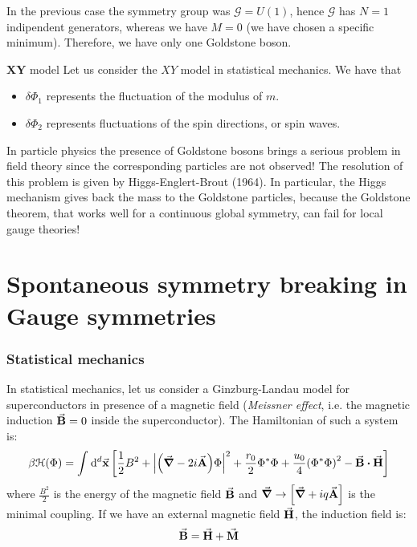 \documentclass[../main/main.tex]{subfiles}
\begin{document}
In the previous case the symmetry group was \( \mathcal{G} = U (1) \), hence \( \mathcal{G} \) has \( N=1 \) indipendent generators, whereas we have \( M=0 \) (we have chosen a specific minimum). Therefore, we have only one Goldstone boson.


\begin{example}{\(\pmb{XY}\) model}{}
Let us consider the \( XY \) model in statistical mechanics. We have that
\begin{itemize}
\item \( \delta \Phi _1 \) represents the fluctuation of the modulus of \( m \).
\item \( \delta \Phi _2 \) represents fluctuations of the spin directions, or spin waves.
\end{itemize}
\end{example}

\begin{remark}
In particle physics the presence of Goldstone bosons brings a serious problem in field theory since the corresponding particles are not observed! The resolution of this problem is given by Higgs-Englert-Brout (1964). In particular, the Higgs mechanism gives back the mass to the Goldstone particles, because the Goldstone theorem, that works well for a continuous global symmetry, can fail for local gauge theories!
\end{remark}



\section{Spontaneous symmetry breaking in Gauge symmetries}

\subsubsection{Statistical mechanics}

In statistical mechanics, let us consider a Ginzburg-Landau model for superconductors in presence of a magnetic field (\emph{Meissner effect}, i.e. the magnetic induction \( \va{B} = 0 \) inside the superconductor). The Hamiltonian of such a system is:
\begin{equation}
  \beta \mathcal{H} (\Phi ) = \int_{}^{} \dd[d]{\va{x}} \qty[\frac{1}{2}B^2 + \abs{\qty(\va{\grad }- 2 i \va{A})\Phi  }^2 + \frac{r_0}{2} \Phi ^* \Phi
  + \frac{u_0}{4} \qty(\Phi ^* \Phi )^2 - \va{B} \vdot \va{H}]
\end{equation}
where \( \frac{B^2}{2} \) is the energy of the magnetic field \( \va{B} \) and \( \va{\grad } \rightarrow \qty[\va{\grad } + i q \va{A}]  \) is the minimal coupling.
If we have an external magnetic field \( \va{H} \), the induction field is:
\begin{equation*}
  \va{B} = \va{H} + \va{M}
\end{equation*}
\end{document}
